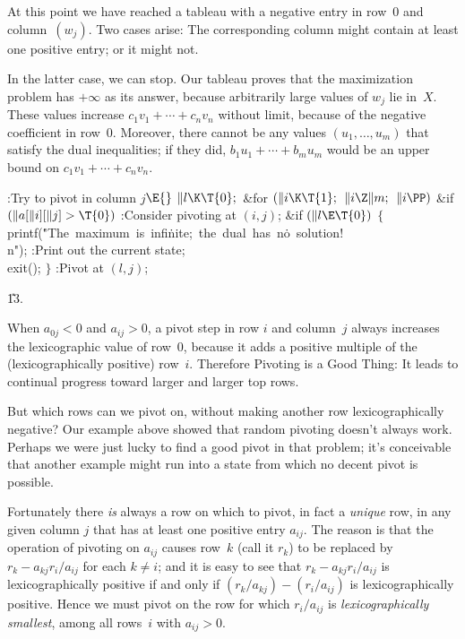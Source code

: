 At this point we have reached a tableau with a negative entry
in row~0
and column~$(w_j)$. Two cases arise: The corresponding column might
contain at least one positive entry; or it might not.

In the latter case, we can stop. Our tableau proves that the maximization
problem has $+\infty$ as its answer, because arbitrarily large values
of $w_j$ lie in~$X$. These values increase $c_1v_1+\cdots+c_nv_n$ without
limit, because of the negative coefficient in row~0. Moreover, there
cannot be any values $(u_1,\ldots,u_m)$ that satisfy the dual inequalities;
if they did, $b_1u_1+\cdots+b_mu_m$ would be an upper bound on
$c_1v_1+\cdots+c_nv_n$.

\Y\B\4:Try to pivot in column $j$\X${}\E{}$\6
$\|l\K\T{0};{}$\6
\&{for} ${}(\|i\K\T{1};{}$ ${}\|i\Z\|m;{}$ ${}\|i\PP){}$\1\6
\&{if} ${}(\|a[\|i][\|j]>\T{0}){}$\1\5
:Consider pivoting at $(i,j)$\X;\2\2\6
\&{if} ${}(\|l\E\T{0}){}$\5
${}\{{}$\1\6
\\{printf}(\.{"The\ maximum\ is\ infi}\)\.{nite;\ the\ dual\ has\ n}\)\.{o\
solution!\\n"});\6
:Print out the current state\X;\6
\\{exit}();\6
\4${}\}{}$\2\6
:Pivot at $(l,j)$\X;\par
\U13.\fi

When $a_{0j}<0$ and $a_{ij}>0$, a pivot step in row $i$ and
column~$j$
always increases the lexicographic value of row~0, because it adds a positive
multiple of the (lexicographically positive) row~$i$. Therefore Pivoting
is a Good Thing: It leads to continual progress toward larger and larger
top rows.

But which rows can we pivot on, without making another row lexicographically
negative? Our example above showed that random pivoting doesn't always work.
Perhaps we were just lucky to find a good pivot in that problem;
it's conceivable that another example might run into a state from which
no decent pivot is possible.

Fortunately there {\it is\/} always a row on which to pivot, in fact
a {\it unique\/} row, in any
given column $j$ that has at least one positive entry $a_{ij}$.
The reason is that the operation
of pivoting on $a_{ij}$ causes row~$k$ (call it $r_k$) to be
replaced by $r_k-a_{kj}r_i/a_{ij}$ for each $k\ne i$;
and it is easy to see
that $r_k-a_{kj}r_i/a_{ij}$ is lexicographically positive if and only
if $(r_k/a_{kj})-(r_i/a_{ij})$ is lexicographically positive.
Hence we must pivot on the row for which $r_i/a_{ij}$ is {\it lexicographically
smallest}, among all rows~$i$ with $a_{ij}>0$.

